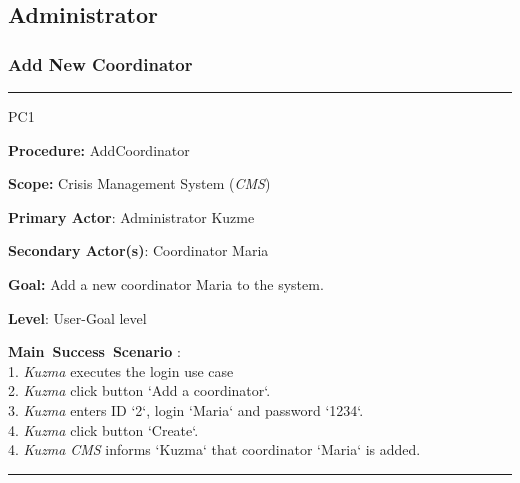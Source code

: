 \subsection{Administrator}

\subsubsection{Add New Coordinator}
\vspace{0.5cm}
\hrule
\begin{lyxlist}{PC1}
\small{
\item [\textbf{Procedure:}] AddCoordinator
\item [\textbf{Scope:}] Crisis Management System (\emph{CMS})
\item [\textbf{Primary Actor}:] Administrator Kuzme
\item [\textbf{Secondary Actor(s)}:] Coordinator Maria
\item [\textbf{Goal:}] Add a new coordinator Maria to the system.
\item [\textbf{Level}:] User-Goal level
\item [\textbf{Main~Success~Scenario}]:\\
1. \emph{Kuzma} executes the login use case\\
2. \emph{Kuzma} click button `Add a coordinator`.\\
3. \emph{Kuzma} enters ID `2`, login `Maria` and password `1234`. \\
4. \emph{Kuzma} click button `Create`. \\
4. \emph{Kuzma} \emph{CMS} informs `Kuzma` that coordinator `Maria` is added. 
}

\end{lyxlist}
\hrule
\vspace{0.5cm}

